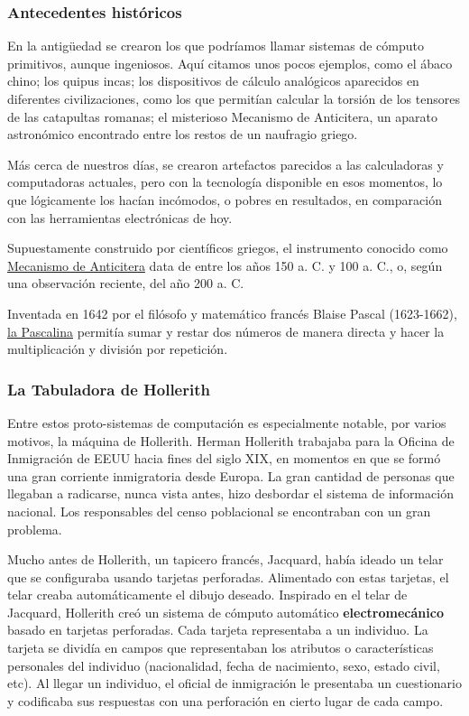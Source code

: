 \documentclass[spanish,a4paper,]{article}
\begin{document}
\hypertarget{antecedentes-histuxf3ricos}{%
\subsubsection{Antecedentes
históricos}\label{antecedentes-histuxf3ricos}}

En la antigüedad se crearon los que podríamos llamar sistemas de cómputo
primitivos, aunque ingeniosos. Aquí citamos unos pocos ejemplos, como el
ábaco chino; los quipus incas; los dispositivos de cálculo analógicos
aparecidos en diferentes civilizaciones, como los que permitían calcular
la torsión de los tensores de las catapultas romanas; el misterioso
Mecanismo de Anticitera, un aparato astronómico encontrado entre los
restos de un naufragio griego.

Más cerca de nuestros días, se crearon artefactos parecidos a las
calculadoras y computadoras actuales, pero con la tecnología disponible
en esos momentos, lo que lógicamente los hacían incómodos, o pobres en
resultados, en comparación con las herramientas electrónicas de hoy.

Supuestamente construido por científicos griegos, el instrumento
conocido como
\href{https://es.m.wikipedia.org/wiki/Mecanismo_de_Anticitera}{Mecanismo
de Anticitera} data de entre los años 150 a. C. y 100 a. C., o, según
una observación reciente, del año 200 a. C.

Inventada en 1642 por el filósofo y matemático francés Blaise Pascal
(1623-1662), \href{https://es.m.wikipedia.org/wiki/Pascalina}{la
Pascalina} permitía sumar y restar dos números de manera directa y hacer
la multiplicación y división por repetición.

\hypertarget{la-tabuladora-de-hollerith}{%
\subsubsection{La Tabuladora de
Hollerith}\label{la-tabuladora-de-hollerith}}

Entre estos proto-sistemas de computación es especialmente notable, por
varios motivos, la máquina de Hollerith. Herman Hollerith trabajaba para
la Oficina de Inmigración de EEUU hacia fines del siglo XIX, en momentos
en que se formó una gran corriente inmigratoria desde Europa. La gran
cantidad de personas que llegaban a radicarse, nunca vista antes, hizo
desbordar el sistema de información nacional. Los responsables del censo
poblacional se encontraban con un gran problema.

Mucho antes de Hollerith, un tapicero francés, Jacquard, había ideado un
telar que se configuraba usando tarjetas perforadas. Alimentado con
estas tarjetas, el telar creaba automáticamente el dibujo deseado.
Inspirado en el telar de Jacquard, Hollerith creó un sistema de cómputo
automático \textbf{electromecánico} basado en tarjetas perforadas. Cada
tarjeta representaba a un individuo. La tarjeta se dividía en campos que
representaban los atributos o características personales del individuo
(nacionalidad, fecha de nacimiento, sexo, estado civil, etc). Al llegar
un individuo, el oficial de inmigración le presentaba un cuestionario y
codificaba sus respuestas con una perforación en cierto lugar de cada
campo.
\end{document}
